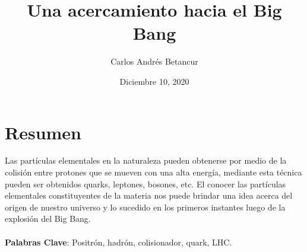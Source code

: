 \documentclass[%
 reprint,
 amsmath,amssymb,
 aps,
]{revtex4-2}
\begin{document}

\title{Una acercamiento hacia el Big Bang}%



 \author{Carlos Andrés Betancur}


%


\date{Diciembre 10, 2020}%
\begin{abstract}

\end{abstract}


\maketitle


\section{\label{sec:level1}Resumen}
Las partículas elementales en la naturaleza pueden obtenerse por medio de la colisión entre protones que se mueven con una alta energía, mediante esta técnica pueden ser obtenidos quarks, leptones, bosones, etc. El conocer las partículas elementales constituyentes de la materia nos puede brindar una idea acerca del origen de nuestro universo y lo sucedido en los primeros instantes luego de la explosión del Big Bang.\\
\\
\textbf{Palabras Clave}: Positrón, hadrón, colisionador, quark, LHC.
\end{document}
